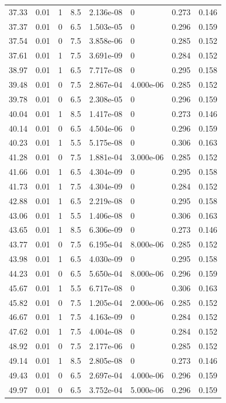 \documentclass[preview]{standalone}
\begin{document}
{{{\begin{tabular}{L{1.2cm}C{1.2cm} C{0.3cm}C{0.5cm} C{1.4cm}C{1.4cm} C{1.4cm}C{1.4cm}}
  37.33  &  0.01  & 1     & 8.5 &  2.136e-08  & 0  & 0.273 &  0.146   \\ 
  37.37  &  0.01  & 0     & 6.5 &  1.503e-05  & 0  & 0.296 &  0.159   \\ 
  37.54  &  0.01  & 0     & 7.5 &  3.858e-06  & 0  & 0.285 &  0.152   \\ 
  37.61  &  0.01  & 1     & 7.5 &  3.691e-09  & 0  & 0.284 &  0.152   \\ 
  38.97  &  0.01  & 1     & 6.5 &  7.717e-08  & 0  & 0.295 &  0.158   \\ 
  39.48  &  0.01  & 0     & 7.5 &  2.867e-04  & 4.000e-06  & 0.285 &  0.152   \\ 
  39.78  &  0.01  & 0     & 6.5 &  2.308e-05  & 0  & 0.296 &  0.159   \\ 
  40.04  &  0.01  & 1     & 8.5 &  1.417e-08  & 0  & 0.273 &  0.146   \\ 
  40.14  &  0.01  & 0     & 6.5 &  4.504e-06  & 0  & 0.296 &  0.159   \\ 
  40.23  &  0.01  & 1     & 5.5 &  5.175e-08  & 0  & 0.306 &  0.163   \\ 
  41.28  &  0.01  & 0     & 7.5 &  1.881e-04  & 3.000e-06  & 0.285 &  0.152   \\ 
  41.66  &  0.01  & 1     & 6.5 &  4.304e-09  & 0  & 0.295 &  0.158   \\ 
  41.73  &  0.01  & 1     & 7.5 &  4.304e-09  & 0  & 0.284 &  0.152   \\ 
  42.88  &  0.01  & 1     & 6.5 &  2.219e-08  & 0  & 0.295 &  0.158   \\ 
  43.06  &  0.01  & 1     & 5.5 &  1.406e-08  & 0  & 0.306 &  0.163   \\ 
  43.65  &  0.01  & 1     & 8.5 &  6.306e-09  & 0  & 0.273 &  0.146   \\ 
  43.77  &  0.01  & 0     & 7.5 &  6.195e-04  & 8.000e-06  & 0.285 &  0.152   \\ 
  43.98  &  0.01  & 1     & 6.5 &  4.030e-09  & 0  & 0.295 &  0.158   \\ 
  44.23  &  0.01  & 0     & 6.5 &  5.650e-04  & 8.000e-06  & 0.296 &  0.159   \\ 
  45.67  &  0.01  & 1     & 5.5 &  6.717e-08  & 0  & 0.306 &  0.163   \\ 
  45.82  &  0.01  & 0     & 7.5 &  1.205e-04  & 2.000e-06  & 0.285 &  0.152   \\ 
  46.67  &  0.01  & 1     & 7.5 &  4.163e-09  & 0  & 0.284 &  0.152   \\ 
  47.62  &  0.01  & 1     & 7.5 &  4.004e-08  & 0  & 0.284 &  0.152   \\ 
  48.92  &  0.01  & 0     & 7.5 &  2.177e-06  & 0  & 0.285 &  0.152   \\ 
  49.14  &  0.01  & 1     & 8.5 &  2.805e-08  & 0  & 0.273 &  0.146   \\ 
  49.43  &  0.01  & 0     & 6.5 &  2.697e-04  & 4.000e-06  & 0.296 &  0.159   \\ 
  49.97  &  0.01  & 0     & 6.5 &  3.752e-04  & 5.000e-06  & 0.296 &  0.159   \\ 
\hline 
\end{tabular} 

}}}
\end{document}
